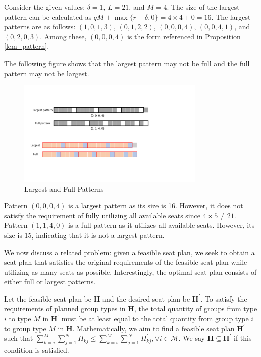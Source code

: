 \begin{example}\label{ex_2}
Consider the given values: $\delta = 1$, $L = 21$, and $M = 4$. The size of the largest pattern can be calculated as $qM + \max\{r-\delta, 0\} = 4 \times 4 + 0 = 16$. The largest patterns are as follows: $(1, 0, 1, 3)$, $(0, 1, 2, 2)$, $(0, 0, 0, 4)$, $(0, 0, 4, 1)$, and $(0, 2, 0, 3)$. Among these, $(0, 0, 0, 4)$ is the form referenced in Proposition \ref{lem_pattern}.

The following figure shows that the largest pattern may not be full and the full pattern may not be largest.
\begin{figure}[ht]
    \centering
        \includegraphics[width=0.8\textwidth]{./Figures/largest_full.pdf}
    \caption{Largest and Full Patterns}
\end{figure}

Pattern $(0, 0, 0, 4)$ is a largest pattern as its size is 16. However, it does not satisfy the requirement of fully utilizing all available seats since $4 \times 5 \neq 21$. Pattern $(1, 1, 4, 0)$ is a full pattern as it utilizes all available seats. However, its size is 15, indicating that it is not a largest pattern.
\end{example}


We now discuss  a related problem: given a feasible seat plan, we seek to obtain a seat plan that satisfies the original requirements of the feasible seat plan while utilizing as many seats as possible. Interestingly, the optimal seat plan consists of either full or largest patterns.

Let the feasible seat plan be $\bm{H}$ and the desired seat plan be $\bm{H}^{\prime}$. To satisfy the requirements of planned group types in $\bm{H}$, the total quantity of groups from type $i$ to type $M$ in $\bm{H}^{\prime}$ must be at least equal to the total quantity from group type $i$ to group type $M$ in $\bm{H}$. Mathematically, we aim to find a feasible seat plan $\bm{H}^{\prime}$ such that $\sum_{k=i}^{M} \sum_{j=1}^{N} H_{kj} \leq \sum_{k=i}^{M} \sum_{j=1}^{N} H^{\prime}_{kj}, \forall i \in \mathcal{M}$. We say $\bm{H} \subseteq \bm{H}^{\prime}$ if this condition is satisfied.

